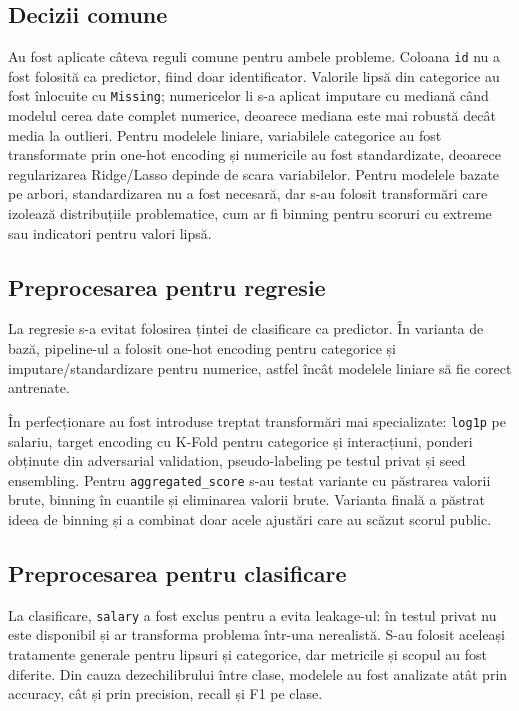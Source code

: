 \documentclass[12pt,a4paper]{article}
\begin{document}
\subsection{Decizii comune}
Au fost aplicate câteva reguli comune pentru ambele probleme. Coloana \texttt{id} nu a fost folosită ca predictor, fiind doar identificator. Valorile lipsă din categorice au fost înlocuite cu \texttt{Missing}; numericelor li s-a aplicat imputare cu mediană când modelul cerea date complet numerice, deoarece mediana este mai robustă decât media la outlieri. Pentru modelele liniare, variabilele categorice au fost transformate prin one-hot encoding și numericile au fost standardizate, deoarece regularizarea Ridge/Lasso depinde de scara variabilelor. Pentru modelele bazate pe arbori, standardizarea nu a fost necesară, dar s-au folosit transformări care izolează distribuțiile problematice, cum ar fi binning pentru scoruri cu extreme sau indicatori pentru valori lipsă.

\subsection{Preprocesarea pentru regresie}
La regresie s-a evitat folosirea țintei de clasificare ca predictor. În varianta de bază, pipeline-ul a folosit one-hot encoding pentru categorice și imputare/standardizare pentru numerice, astfel încât modelele liniare să fie corect antrenate.

În perfecționare au fost introduse treptat transformări mai specializate: \texttt{log1p} pe salariu, target encoding cu K-Fold pentru categorice și interacțiuni, ponderi obținute din adversarial validation, pseudo-labeling pe testul privat și seed ensembling. Pentru \texttt{aggregated\_score} s-au testat variante cu păstrarea valorii brute, binning în cuantile și eliminarea valorii brute. Varianta finală a păstrat ideea de binning și a combinat doar acele ajustări care au scăzut scorul public.

\subsection{Preprocesarea pentru clasificare}
La clasificare, \texttt{salary} a fost exclus pentru a evita leakage-ul: în testul privat nu este disponibil și ar transforma problema într-una nerealistă. S-au folosit aceleași tratamente generale pentru lipsuri și categorice, dar metricile și scopul au fost diferite. Din cauza dezechilibrului între clase, modelele au fost analizate atât prin accuracy, cât și prin precision, recall și F1 pe clase.
\end{document}
